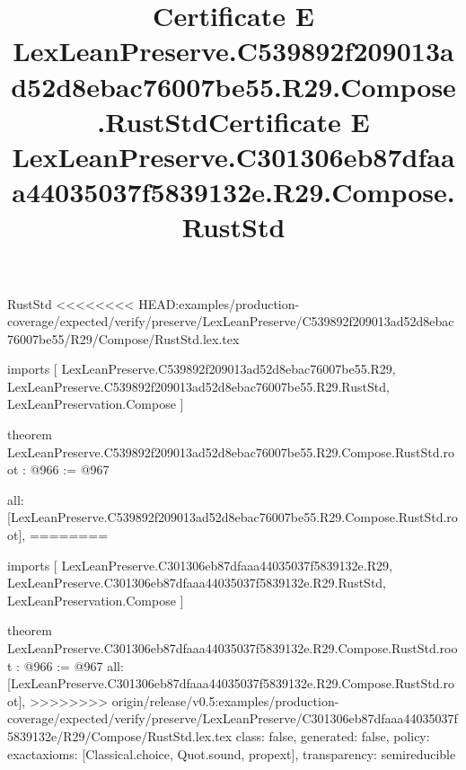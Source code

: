 \begin{lexlean}{RustStd}
<<<<<<<< HEAD:examples/production-coverage/expected/verify/preserve/LexLeanPreserve/C539892f209013ad52d8ebac76007be55/R29/Compose/RustStd.lex.tex
\title{Certificate E LexLeanPreserve.C539892f209013ad52d8ebac76007be55.R29.Compose.RustStd}
\begin{coremodule}
imports [
  LexLeanPreserve.C539892f209013ad52d8ebac76007be55.R29,
  LexLeanPreserve.C539892f209013ad52d8ebac76007be55.R29.RustStd,
  LexLeanPreservation.Compose
]

theorem LexLeanPreserve.C539892f209013ad52d8ebac76007be55.R29.Compose.RustStd.root : @966 := @967 {
  all: [LexLeanPreserve.C539892f209013ad52d8ebac76007be55.R29.Compose.RustStd.root],
========
\title{Certificate E LexLeanPreserve.C301306eb87dfaaa44035037f5839132e.R29.Compose.RustStd}
\begin{coremodule}
imports [
  LexLeanPreserve.C301306eb87dfaaa44035037f5839132e.R29,
  LexLeanPreserve.C301306eb87dfaaa44035037f5839132e.R29.RustStd,
  LexLeanPreservation.Compose
]

theorem LexLeanPreserve.C301306eb87dfaaa44035037f5839132e.R29.Compose.RustStd.root : @966 := @967 {
  all: [LexLeanPreserve.C301306eb87dfaaa44035037f5839132e.R29.Compose.RustStd.root],
>>>>>>>> origin/release/v0.5:examples/production-coverage/expected/verify/preserve/LexLeanPreserve/C301306eb87dfaaa44035037f5839132e/R29/Compose/RustStd.lex.tex
  class: false,
  generated: false,
  policy: exact{axioms: [Classical.choice, Quot.sound, propext]},
  transparency: semireducible
}


\end{coremodule}}
\end{coremodule}
\end{lexlean}

